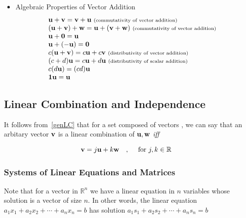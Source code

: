 \documentclass[english,course]{Notes}
\newcommand{\real}{\mathbb{R}}
\newcommand{\ita}[1]{\textit{#1}}
\begin{document}

\begin{itemize}
	\item []Algebraic Properties of Vector Addition
	      $$\begin{array}{l}{\mathbf{u}+\mathbf{v}=\mathbf{v}+\mathbf{u} \text { \scriptsize (commutativity of vector addition) }} \\ {(\mathbf{u}+\mathbf{v})+\mathbf{w}=\mathbf{u}+(\mathbf{v}+\mathbf{w}) \text { \scriptsize(commutativity of vector addition) }} \\ {\mathbf{u}+\mathbf{0}=\mathbf{u}} \\ {\mathbf{u}+(-\mathbf{u})=\mathbf{0}} \\ {c(\mathbf{u}+\mathbf{v})=c \mathbf{u}+c \mathbf{v} \text { \scriptsize(distributivity of vector addition) }} \\ {(c+d) \mathbf{u}=c \mathbf{u}+d \mathbf{u} \text { \scriptsize(distributivity of scalar addition) }} \\ {c(d \mathbf{u})=(c d) \mathbf{u}} \\ {\mathbf{1} \mathbf{u}=\mathbf{u}}\end{array}
	      $$\end{itemize}
	      
	      \subsection{Linear Combination and Independence}
	      
	      
	      \par{It follows from~\ref{genLC} that for a set composed of vectors , we can say that an arbitary vector $\mathbf{v}$ is a linear combination of $\mathbf{u} , \mathbf{w}$ \ita{iff}}
	      
	      $$ \vc{v} = j\vc{u} + k\vc{w} \quad , \quad \text{ for } j, k \in \real~\label{lc}$$
	      
	      \subsubsection{Systems of Linear Equations and Matrices}
	      
	      \par{Note that for a vector in $\real^{n}$ we have a linear equation in $n$ variables whose solution is  a vector of size $n$. In other words, the linear equation $a_{1} x_{1}+a_{2} x_{2}+\cdots + a_{n} x_{n}=b$ has solution $a_{1} s_{1}+a_{2} s_{2}+\cdots +a_{n} s_{n}=b$}
	      
\end{document}
